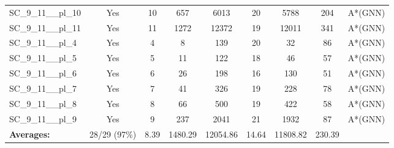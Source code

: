 \documentclass{article}
\begin{document}
\begin{tabular}{lcccccccc}
SC\_9\_11\_\_pl\_10 & Yes & 10 & 657 & 6013 & 20 & 5788 & 204 & A*(GNN) \\
SC\_9\_11\_\_pl\_11 & Yes & 11 & 1272 & 12372 & 19 & 12011 & 341 & A*(GNN) \\
SC\_9\_11\_\_pl\_4 & Yes & 4 & 8 & 139 & 20 & 32 & 86 & A*(GNN) \\
SC\_9\_11\_\_pl\_5 & Yes & 5 & 11 & 122 & 18 & 46 & 57 & A*(GNN) \\
SC\_9\_11\_\_pl\_6 & Yes & 6 & 26 & 198 & 16 & 130 & 51 & A*(GNN) \\
SC\_9\_11\_\_pl\_7 & Yes & 7 & 41 & 326 & 19 & 228 & 78 & A*(GNN) \\
SC\_9\_11\_\_pl\_8 & Yes & 8 & 66 & 500 & 19 & 422 & 58 & A*(GNN) \\
SC\_9\_11\_\_pl\_9 & Yes & 9 & 237 & 2041 & 21 & 1932 & 87 & A*(GNN) \\
\textbf{Averages:} & 28/29 (97\%) & 8.39 & 1480.29 & 12054.86 & 14.64 & 11808.82 & 230.39 & \\
\bottomrule
\end{tabular}
\\[0.7cm]
\end{document}
